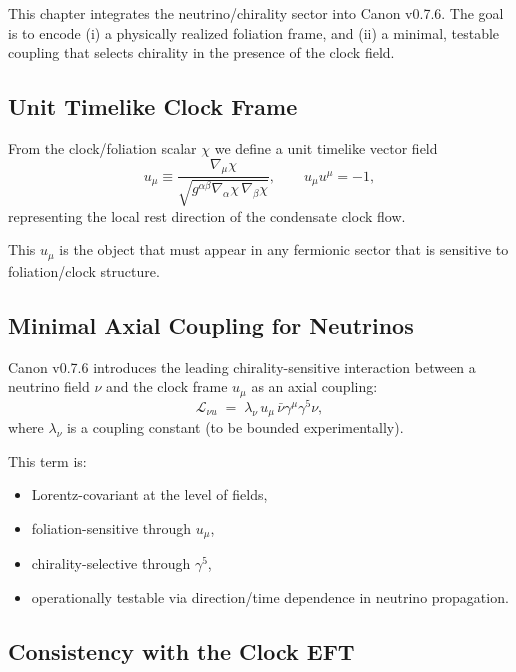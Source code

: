 \documentclass[10pt]{article}
\begin{document}
This chapter integrates the neutrino/chirality sector into Canon v0.7.6. The
goal is to encode (i) a physically realized foliation frame, and (ii) a minimal,
testable coupling that selects chirality in the presence of the clock field.

\subsection{Unit Timelike Clock Frame}

From the clock/foliation scalar $\chi$ we define a unit timelike vector field
\begin{equation}
    u_\mu \equiv \frac{\nabla_\mu \chi}{\sqrt{g^{\alpha\beta}\nabla_\alpha\chi\,\nabla_\beta\chi}},
    \qquad
    u_\mu u^\mu = -1,
    \label{eq:unit_u}
\end{equation}
representing the local rest direction of the condensate clock flow.

This $u_\mu$ is the object that must appear in any fermionic sector that is
sensitive to foliation/clock structure.

\subsection{Minimal Axial Coupling for Neutrinos}

Canon v0.7.6 introduces the leading chirality-sensitive interaction between
a neutrino field $\nu$ and the clock frame $u_\mu$ as an axial coupling:
\begin{equation}
    \mathcal{L}_{\nu u}
    \;=\;
    \lambda_\nu\,u_\mu\,\bar{\nu}\gamma^\mu\gamma^5\nu,
    \label{eq:axial_coupling}
\end{equation}
where $\lambda_\nu$ is a coupling constant (to be bounded experimentally).

This term is:
\begin{itemize}
    \item Lorentz-covariant at the level of fields,
    \item foliation-sensitive through $u_\mu$,
    \item chirality-selective through $\gamma^5$,
    \item operationally testable via direction/time dependence in neutrino propagation.
\end{itemize}

\subsection{Consistency with the Clock EFT}
\end{document}
